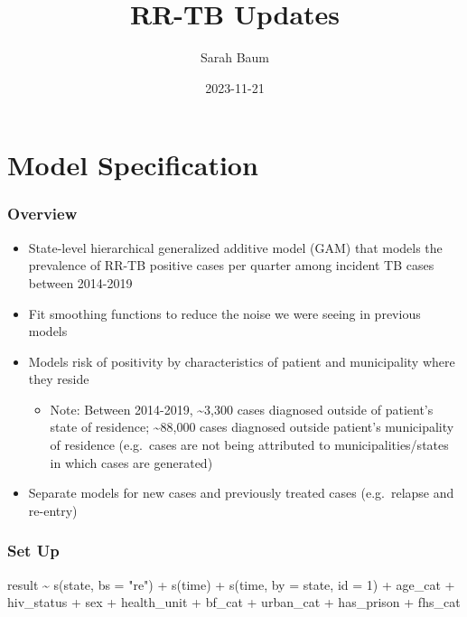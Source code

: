 \documentclass[
]{article}
\title{RR-TB Updates}
\author{Sarah Baum}
\date{2023-11-21}
\newenvironment{Shaded}{\begin{snugshade}}{\end{snugshade}}
\newcommand{\AttributeTok}[1]{\textcolor[rgb]{0.77,0.63,0.00}{#1}}
\newcommand{\DecValTok}[1]{\textcolor[rgb]{0.00,0.00,0.81}{#1}}
\newcommand{\FunctionTok}[1]{\textcolor[rgb]{0.00,0.00,0.00}{#1}}
\newcommand{\NormalTok}[1]{#1}
\newcommand{\SpecialCharTok}[1]{\textcolor[rgb]{0.00,0.00,0.00}{#1}}
\newcommand{\StringTok}[1]{\textcolor[rgb]{0.31,0.60,0.02}{#1}}
\providecommand{\tightlist}{%
  \setlength{\itemsep}{0pt}\setlength{\parskip}{0pt}}
\begin{document}
\maketitle

\hypertarget{model-specification}{%
\section{Model Specification}\label{model-specification}}

\hypertarget{overview}{%
\subsubsection{Overview}\label{overview}}

\begin{itemize}
\item
  State-level hierarchical generalized additive model (GAM) that models
  the prevalence of RR-TB positive cases per quarter among incident TB
  cases between 2014-2019
\item
  Fit smoothing functions to reduce the noise we were seeing in previous
  models
\item
  Models risk of positivity by characteristics of patient and
  municipality where they reside

  \begin{itemize}
  \tightlist
  \item
    Note: Between 2014-2019, \textasciitilde3,300 cases diagnosed
    outside of patient's state of residence; \textasciitilde88,000 cases
    diagnosed outside patient's municipality of residence (e.g.~cases
    are not being attributed to municipalities/states in which cases are
    generated)
  \end{itemize}
\item
  Separate models for new cases and previously treated cases
  (e.g.~relapse and re-entry)
\end{itemize}

\hypertarget{set-up}{%
\subsubsection{Set Up}\label{set-up}}

\begin{Shaded}
\begin{Highlighting}[]
\NormalTok{result }\SpecialCharTok{\textasciitilde{}} \FunctionTok{s}\NormalTok{(state, }\AttributeTok{bs =} \StringTok{"re"}\NormalTok{) }\SpecialCharTok{+} \FunctionTok{s}\NormalTok{(time) }\SpecialCharTok{+} \FunctionTok{s}\NormalTok{(time, }\AttributeTok{by =}\NormalTok{ state, }\AttributeTok{id =} \DecValTok{1}\NormalTok{) }\SpecialCharTok{+}\NormalTok{ age\_cat }\SpecialCharTok{+}\NormalTok{ hiv\_status }\SpecialCharTok{+}\NormalTok{ sex }\SpecialCharTok{+}\NormalTok{ health\_unit }\SpecialCharTok{+}\NormalTok{ bf\_cat }\SpecialCharTok{+}\NormalTok{ urban\_cat }\SpecialCharTok{+}\NormalTok{ has\_prison }\SpecialCharTok{+}\NormalTok{ fhs\_cat}
\end{Highlighting}
\end{Shaded}
\end{document}
